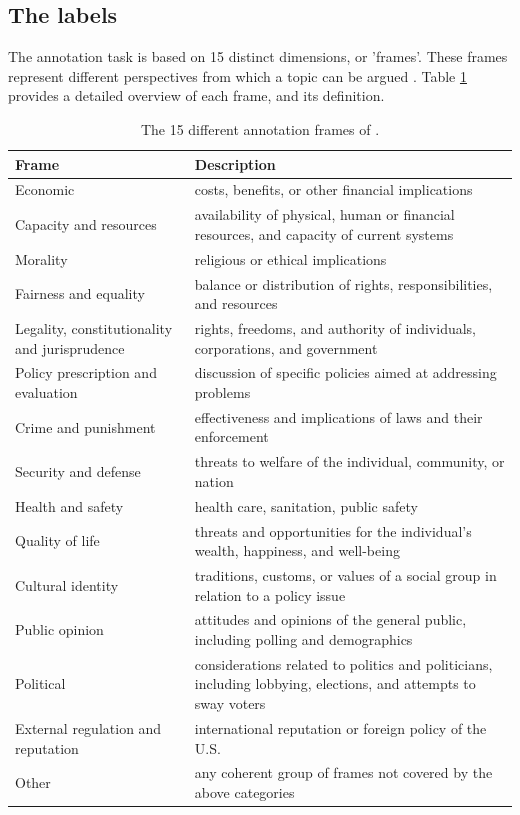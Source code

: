 \documentclass[
10pt, %
a4paper, %
oneside, %
headinclude,footinclude, %
] {book}%
\begin{document}
\subsection{The labels}
The annotation task is based on 15 distinct dimensions, or 'frames'. These frames represent different perspectives from which a topic can be argued \citep{card2015media}. Table \ref{tab:annotation_labels} provides a detailed overview of each frame, and its definition.
\begin{table}
\small
    \centering
    \renewcommand{\arraystretch}{1.2}
    \begin{tabular}{|>{\raggedright\arraybackslash}p{35mm}|>{\raggedright\arraybackslash}p{10cm}|}\hline
        \textbf{Frame} & \textbf{Description} \\\hline
        Economic & costs, benefits, or other financial implications\\\hline
        Capacity and resources & availability of physical, human
or financial resources, and capacity of current systems\\\hline
        Morality & religious or ethical implications\\\hline
        Fairness and equality & balance or distribution of rights, responsibilities, and resources\\\hline
        Legality, constitutionality and jurisprudence & rights,
freedoms, and authority of individuals, corporations, and
government\\\hline
        Policy prescription and evaluation & discussion of specific policies aimed at addressing problems\\\hline
        Crime and punishment & effectiveness and implications of laws and their enforcement\\\hline
        Security and defense & threats to welfare of the individual, community, or nation\\\hline
        Health and safety & health care, sanitation, public safety\\\hline
        Quality of life & threats and opportunities for the individual’s wealth, happiness, and well-being\\\hline
        Cultural identity & traditions, customs, or values of a social group in relation to a policy issue\\\hline
        Public opinion & attitudes and opinions of the general public, including polling and demographics\\\hline
        Political & considerations related to politics and politicians, including lobbying, elections, and attempts to sway voters\\\hline
        External regulation and reputation & international reputation or foreign policy of the U.S.\\\hline
        Other & any coherent group of frames not covered by the
above categories\\ \hline
    \end{tabular}
    \caption{The 15 different annotation frames of \cite{card2015media}.}
    \label{tab:annotation_labels}
\end{table}
\end{document}

